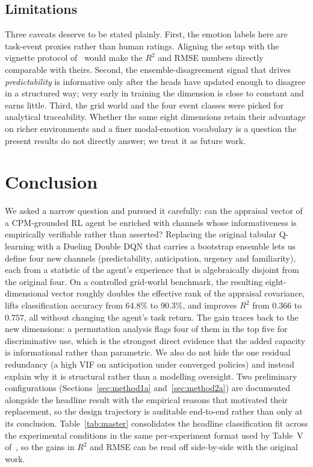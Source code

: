 \documentclass[conference]{IEEEtran}
\begin{document}
\subsection{Limitations}
Three caveats deserve to be stated plainly. First, the emotion labels
here are task-event proxies rather than human ratings. Aligning the
setup with the vignette protocol of~\cite{zhang2023modeling} would
make the $R^{2}$ and RMSE numbers directly comparable with theirs.
Second, the ensemble-disagreement signal that drives \emph{predictability}
is informative only after the heads have updated enough to disagree in
a structured way; very early in training the dimension is close to
constant and earns little. Third, the grid world and the four event
classes were picked for analytical traceability. Whether the same
eight dimensions retain their advantage on richer environments and a
finer modal-emotion vocabulary is a question the present results do
not directly answer; we treat it as future work.

\section{Conclusion}
\label{sec:conclusion}

We asked a narrow question and pursued it carefully: can the appraisal
vector of a CPM-grounded RL agent be enriched with channels whose
informativeness is empirically verifiable rather than asserted? Replacing
the original tabular Q-learning with a Dueling Double DQN that carries a
bootstrap ensemble lets us define four new channels (predictability,
anticipation, urgency and familiarity), each from a statistic of the
agent's experience that is algebraically disjoint from the original four.
On a controlled grid-world benchmark, the resulting eight-dimensional
vector roughly doubles the effective rank of the appraisal covariance,
lifts classification accuracy from $64.8\%$ to $90.3\%$, and improves
$R^{2}$ from $0.366$ to $0.757$, all without changing the agent's task
return. The gain traces back to the new dimensions: a permutation
analysis flags four of them in the top five for discriminative use,
which is the strongest direct evidence that the added capacity is
informational rather than parametric. We also do not hide the one
residual redundancy (a high VIF on anticipation under converged
policies) and instead explain why it is structural rather than a
modelling oversight. Two preliminary configurations
(Sections~\ref{sec:method1a} and~\ref{sec:method2a}) are documented
alongside the headline result with the empirical reasons that
motivated their replacement, so the design trajectory is auditable
end-to-end rather than only at its conclusion. Table~\ref{tab:master}
consolidates the headline
classification fit across the experimental conditions in the same
per-experiment format used by Table~V of~\cite{zhang2023modeling}, so
the gains in $R^{2}$ and RMSE can be read off side-by-side with the
original work.
\end{document}
